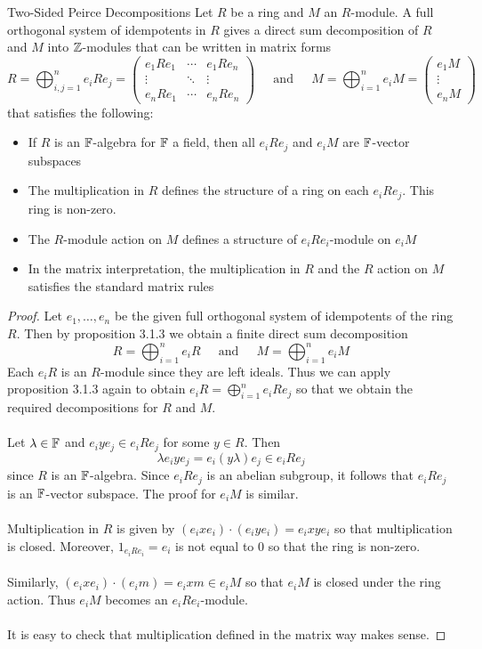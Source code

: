 \documentclass[a4paper]{article}
\begin{document}
\begin{thm}{Two-Sided Peirce Decompositions}{} Let $R$ be a ring and $M$ an $R$-module. A full orthogonal system of idempotents in $R$ gives a direct sum decomposition of $R$ and $M$ into $\mathbb{Z}$-modules that can be written in matrix forms $$R=\bigoplus_{i,j=1}^n e_iRe_j=\begin{pmatrix}
e_1Re_1 & \cdots & e_1Re_n\\
\vdots & \ddots & \vdots\\
e_nRe_1 & \cdots & e_nRe_n
\end{pmatrix}\;\;\;\;\text{ and }\;\;\;\;M=\bigoplus_{i=1}^ne_iM=\begin{pmatrix}
e_1M\\
\vdots\\
e_nM
\end{pmatrix}$$ that satisfies the following: 
\begin{itemize}
\item If $R$ is an $\mathbb{F}$-algebra for $\mathbb{F}$ a field, then all $e_iRe_j$ and $e_iM$ are $\mathbb{F}$-vector subspaces
\item The multiplication in $R$ defines the structure of a ring on each $e_iRe_j$. This ring is non-zero. 
\item The $R$-module action on $M$ defines a structure of $e_iRe_i$-module on $e_iM$
\item In the matrix interpretation, the multiplication in $R$ and the $R$ action on $M$ satisfies the standard matrix rules
\end{itemize} \tcbline
\begin{proof}
Let $e_1,\dots,e_n$ be the given full orthogonal system of idempotents of the ring $R$.  Then by proposition 3.1.3 we obtain a finite direct sum decomposition $$R=\bigoplus_{i=1}^ne_iR\;\;\;\;\text{ and }\;\;\;\;M=\bigoplus_{i=1}^ne_iM$$ Each $e_iR$ is an $R$-module since they are left ideals. Thus we can apply proposition 3.1.3 again to obtain $e_iR=\bigoplus_{i=1}^ne_iRe_j$ so that we obtain the required decompositions for $R$ and $M$. \\~\\

Let $\lambda\in\mathbb{F}$ and $e_iye_j\in e_iRe_j$ for some $y\in R$. Then $$\lambda e_iye_j=e_i(y\lambda)e_j\in e_iRe_j$$ since $R$ is an $\mathbb{F}$-algebra. Since $e_iRe_j$ is an abelian subgroup, it follows that $e_iRe_j$ is an $\mathbb{F}$-vector subspace. The proof for $e_iM$ is similar. \\~\\

Multiplication in $R$ is given by $(e_ixe_i)\cdot(e_iye_i)=e_ixye_i$ so that multiplication is closed. Moreover, $1_{e_iRe_i}=e_i$ is not equal to $0$ so that the ring is non-zero. \\~\\

Similarly, $(e_ixe_i)\cdot(e_im)=e_ixm\in e_iM$ so that $e_iM$ is closed under the ring action. Thus $e_iM$ becomes an $e_iRe_i$-module. \\~\\

It is easy to check that multiplication defined in the matrix way makes sense. 
\end{proof}
\end{thm}
\end{document}
